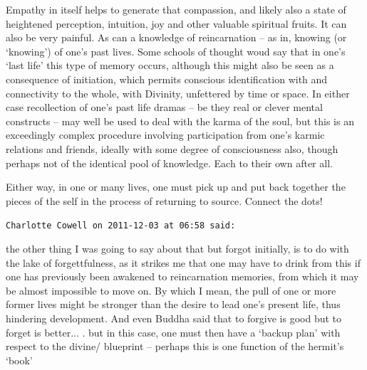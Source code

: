 \begin{footnotesize}
\begin{sffamily}
Empathy in itself helps to generate that compassion, and likely also a state of heightened perception, intuition, joy and other valuable spiritual fruits. It can also be very painful. As can a knowledge of reincarnation -- as in, knowing (or `knowing') of one's past lives. Some schools of thought woud say that in one's `last life' this type of memory occurs, although this might also be seen as a consequence of initiation, which permits conscious identification with and connectivity to the whole, with Divinity, unfettered by time or space. In either case recollection of one's past life dramas -- be they real or clever mental constructs -- may well be used to deal with the karma of the soul, but this is an exceedingly complex procedure involving participation from one's karmic relations and friends, ideally with some degree of consciousness also, though perhaps not of the identical pool of knowledge. Each to their own after all.

Either way, in one or many lives, one must pick up and put back together the pieces of the self in the process of returning to source. Connect the dots!

\hfill

\texttt{Charlotte Cowell on 2011-12-03 at 06:58 said:}

the other thing I was going to say about that but forgot initially, is to do with the lake of forgettfulness, as it strikes me that one may have to drink from this if one has previously been awakened to reincarnation memories, from which it may be almost impossible to move on. By which I mean, the pull of one or more former lives might be stronger than the desire to lead one's present life, thus hindering development. And even Buddha said that to forgive is good but to forget is better... . but in this case, one must then have a `backup plan' with respect to the divine/ blueprint -- perhaps this is one function of the hermit's `book'


\hfill

\end{sffamily}
\end{footnotesize}

